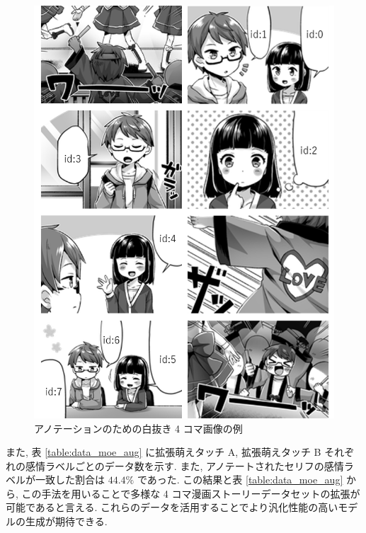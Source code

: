 \begin{figure}[!h]
  \vspace{1mm}
  \centering
  \includegraphics[width=0.4\hsize]{doc/figures/shironuki.png}
  \caption{アノテーションのための白抜き 4 コマ画像の例}
  \label{fig:shironuki}
\end{figure}

\begin{table}[!h]
\vspace{5mm}
\caption{アノテートされたセリフと感情ラベルの例}
\label{table:aug_data}
\centering
{}
\vspace{1mm}
\end{table}

\newpage
また, 表 \ref{table:data_moe_aug} に拡張萌えタッチ A, 拡張萌えタッチ B それぞれの感情ラベルごとのデータ数を示す. また, アノテートされたセリフの感情ラベルが一致した割合は $44.4 \%$ であった. この結果と表 \ref{table:data_moe_aug} から, この手法を用いることで多様な 4 コマ漫画ストーリーデータセットの拡張が可能であると言える. これらのデータを活用することでより汎化性能の高いモデルの生成が期待できる.


